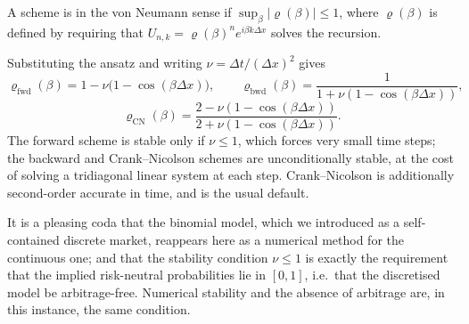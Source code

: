 \documentclass[a4paper]{scrartcl}
\begin{document}
\begin{definition}
	A scheme is  in the von Neumann sense if $\sup_\beta|\varrho(\beta)|\leq1$, where $\varrho(\beta)$ is defined by requiring that $U_{n,k}=\varrho(\beta)^ne^{i\beta k\Delta x}$ solves the recursion.
\end{definition}

Substituting the ansatz and writing $\nu = \Delta t/(\Delta x)^2$ gives
$$
\varrho_{\mathrm{fwd}}(\beta) = 1 - \nu\big(1-\cos(\beta\Delta x)\big), \qquad \varrho_{\mathrm{bwd}}(\beta) = \frac{1}{1+\nu(1-\cos(\beta\Delta x))},
$$
$$
\varrho_{\mathrm{CN}}(\beta) = \frac{2 - \nu(1-\cos(\beta\Delta x))}{2+\nu(1-\cos(\beta\Delta x))}.
$$
The forward scheme is stable only if $\nu \leq 1$, which forces very small time steps; the backward and Crank--Nicolson schemes are unconditionally stable, at the cost of solving a tridiagonal linear system at each step. Crank--Nicolson is additionally second-order accurate in time, and is the usual default.

\begin{remark}
	It is a pleasing coda that the binomial model, which we introduced as a self-contained discrete market, reappears here as a numerical method for the continuous one; and that the stability condition $\nu\leq1$ is exactly the requirement that the implied risk-neutral probabilities lie in $[0,1]$, i.e.\ that the discretised model be arbitrage-free. Numerical stability and the absence of arbitrage are, in this instance, the same condition.
\end{remark}
\end{document}
